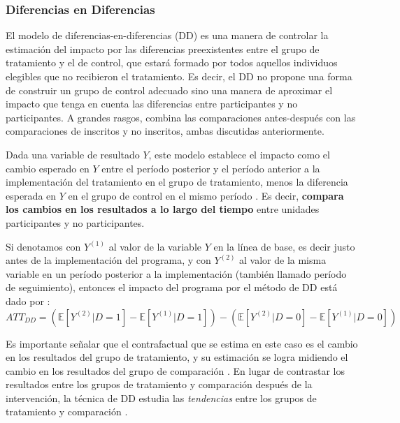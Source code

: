 \documentclass[../../main.tex]{subfiles}
\begin{document}
\subsubsection{Diferencias en Diferencias}
El modelo de diferencias-en-diferencias (DD) es una manera de controlar la estimación del
impacto por las diferencias preexistentes entre el grupo de tratamiento y el de control,
que estará formado por todos aquellos individuos elegibles que no recibieron el
tratamiento. Es decir, el DD no propone una forma de construir un grupo de control
adecuado sino una manera de aproximar el impacto que tenga en cuenta las diferencias entre
participantes y no participantes. A grandes rasgos, combina las comparaciones
antes-después con las comparaciones de inscritos y no inscritos, ambas discutidas
anteriormente.

Dada una variable de resultado \(Y\), este modelo establece el impacto como el cambio
esperado en \(Y\) entre el período posterior y el período anterior a la implementación del
tratamiento en el grupo de tratamiento, menos la diferencia esperada en \(Y\) en el grupo
de control en el mismo período \cite{bernal}. Es decir, \textbf{compara los cambios en los
resultados a lo largo del tiempo} entre unidades participantes y no participantes.

Si denotamos con \(Y^{(1)}\) al valor de la variable \(Y\) en la línea de base, es decir justo
antes de la implementación del programa, y con \(Y^{(2)}\) al valor de la misma variable en
un período posterior a la implementación (también llamado período de seguimiento),
entonces el impacto del programa por el método de DD está dado por\footnotemark
{}:
\begin{equation}
    ATT_{DD} =
        \left(
            \mathbb{E}\left[Y^{(2)}|D=1\right] - \mathbb{E}\left[Y^{(1)}|D=1\right]
        \right) -
        \left(
            \mathbb{E}\left[Y^{(2)}|D=0\right] - \mathbb{E}\left[Y^{(1)}|D=0\right]
        \right)
        \label{eq:dif-en-dif-1}
\end{equation}

Es importante señalar que el contrafactual que se estima en este caso es el cambio en los
resultados del grupo de tratamiento, y su estimación se logra midiendo el cambio en los
resultados del grupo de comparación \cite{gertler-2016}. En lugar de contrastar los
resultados entre los grupos de tratamiento y comparación después de la intervención, la
técnica de DD estudia las \textit{tendencias} entre los grupos de tratamiento y comparación
\cite{gertler-2016}.
\end{document}
